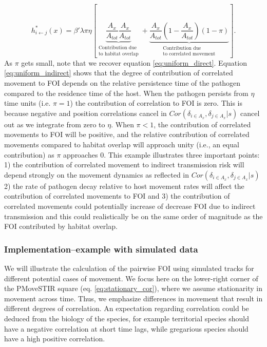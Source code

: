 \documentclass[letterpaper]{article}
\begin{document}
\begin{equation}
    h^*_{i \leftarrow j}(x) = \beta' \lambda \pi \eta \left[ \underbrace{\frac{A_x}{A_{tot}}\frac{A_x}{A_{tot}}}_{\substack{\text{Contribution due} \\ \text{to habitat overlap}}} + \underbrace{\frac{A_x}{A_{tot}}(1 - \frac{A_x}{A_{tot}}) (1 - \pi)}_{\substack{\text{Contribution due} \\ \text{to correlated movement}}} \right].
    \label{eq:uniform_indirect}
\end{equation}
As $\pi$ gets small, note that we recover equation \ref{eq:uniform_direct}.  Equation \ref{eq:uniform_indirect} shows that the degree of contribution of correlated movement to FOI depends on the relative persistence time of the pathogen compared to the residence time of the host.  When the pathogen persists from $\eta$ time units (i.e. $\pi = 1$) the contribution of correlation to FOI is zero.  This is because negative and position correlations cancel in $Cor(\delta_{i \in A_x}, \delta_{j \in A_x} | s)$ cancel out as we integrate from zero to $\eta$.  When $\pi < 1$, the contribution of correlated movements to FOI will be positive, and the relative contribution of correlated movements compared to habitat overlap will approach unity (i.e., an equal contribution) as $\pi$ approaches 0. This example illustrates three important points: 1) the contribution of correlated movement to indirect transmission risk will depend strongly on the movement dynamics as reflected in $Cor(\delta_{i \in A_x}, \delta_{j \in A_x} | s)$ 2) the rate of pathogen decay relative to host movement rates will affect the contribution of correlated movements to FOI and 3) the contribution of correlated movements could potentially increase of decrease FOI due to indirect transmission and this could realistically be on the same order of magnitude as the FOI contributed by habitat overlap.  

\subsubsection*{Implementation--example with simulated data}

We will illustrate the calculation of the pairwise FOI using simulated tracks for different potential cases of movement. We focus here on the lower-right corner of the PMoveSTIR square (eq. \ref{eq:stationary_cor}), where we assume stationarity in movement across time. Thus, we emphasize differences in movement that result in different degrees of correlation. An expectation regarding correlation could be deduced from the biology of the species, for example territorial species should have a negative correlation at short time lags, while gregarious species should have a high positive correlation. 
\end{document}
